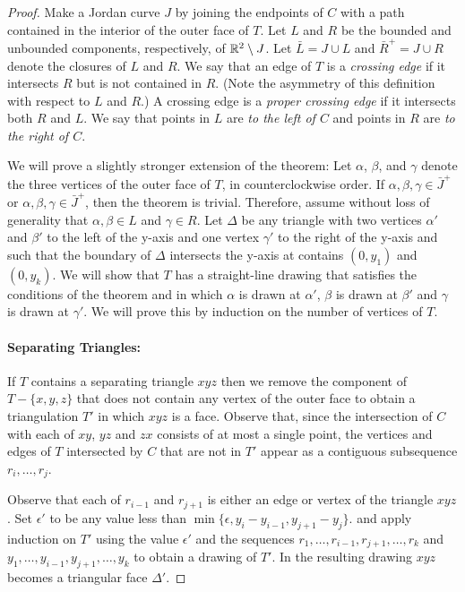 \documentclass{patmorin}
\begin{document}
\begin{proof}
   Make a Jordan curve $J$ by joining the endpoints of $C$ with a path
   contained in the interior of the outer face of $T$.  Let $L$ and $R$ be the bounded
   and unbounded components, respectively, of $\mathbb{R}^2\setminus J$. Let
   $\bar{L}=J\cup L$ and $\bar{R}^+=J\cup R$ denote the closures of $L$
   and $R$.  We say that an edge of $T$ is a \emph{crossing edge} if
   it intersects $R$ but is not contained in $R$.  (Note the asymmetry
   of this definition with respect to $L$ and $R$.)  A crossing edge
   is a \emph{proper crossing edge} if it intersects both $R$ and $L$.
   We say that points in $L$ are \emph{to the left of $C$} and points
   in $R$ are \emph{to the right of $C$}.

   We will prove a slightly stronger extension of the theorem: 
   Let $\alpha$, $\beta$, and $\gamma$
   denote the three vertices of the outer face of $T$, in counterclockwise order.
   If $\alpha,\beta,\gamma\in \bar{J}^+$ or $\alpha,\beta,\gamma\in \bar{J}^+$,
   then the theorem is trivial.  Therefore,  
   assume without loss of generality that $\alpha,\beta\in L$
   and $\gamma\in R$.  Let $\Delta$ be any triangle with two
   vertices $\alpha'$ and $\beta'$ to the left of the y-axis and one
   vertex $\gamma'$ to the right of the y-axis and such that the boundary
   of $\Delta$ intersects the y-axis at contains $(0,y_1)$ and $(0,y_k)$.
   We will show that $T$ has a straight-line drawing that satisfies the
   conditions of the theorem and in which $\alpha$ is drawn at $\alpha'$,
   $\beta$ is drawn at $\beta'$ and $\gamma$ is drawn at $\gamma'$.
   We will prove this by induction on the number of vertices of $T$.

   \paragraph{Separating Triangles:}
   If $T$ contains a separating triangle $xyz$ then we remove the
   component of $T-\{x,y,z\}$ that does not contain any vertex of the outer face to
   obtain a triangulation $T'$ in which $xyz$ is a face.  Observe that,
   since the intersection of $C$ with each of $xy$, $yz$ and $zx$
   consists of at most a single point, the vertices and edges of $T$
   intersected by $C$ that are not in $T'$ appear as a contiguous
   subsequence $r_i,\ldots,r_j$.

   Observe that each of $r_{i-1}$ and $r_{j+1}$ is either an edge
   or vertex of the triangle $xyz$.  Set $\epsilon'$ to be any
   value less than $\min\{\epsilon,y_{i}-y_{i-1}, y_{j+1}-y_j\}$.
   and apply induction on $T'$ using the value $\epsilon'$
   and the sequences $r_1,\ldots,r_{i-1},r_{j+1},\ldots,r_k$ and
   $y_1,\ldots,y_{i-1},y_{j+1},\ldots,y_k$ to obtain a drawing of $T'$.
   In the resulting drawing $xyz$ becomes a triangular face $\Delta'$.


\end{proof}
\end{document}
